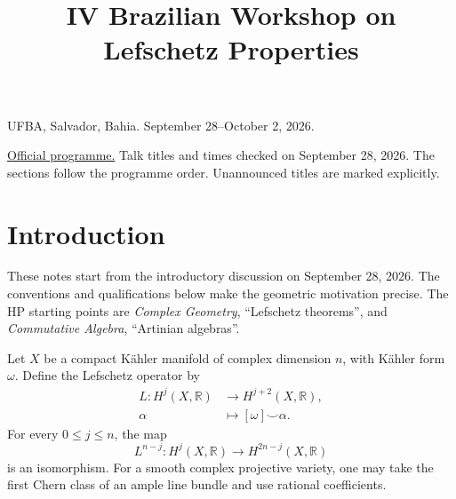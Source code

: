 


\title{IV Brazilian Workshop on
Lefschetz Properties}
\maketitle
{}
\label{section-phantom}
\tableofcontents

\medskip\noindent
UFBA, Salvador, Bahia.
September 28--October 2, 2026.

\href{%
https://jornadaslp.github.io/%
jornadas-lp/programacao.html%
}{Official programme.}
Talk titles and times checked on
September 28, 2026.
The sections follow the programme order.
Unannounced titles are marked explicitly.

\section{Introduction}
\label{section-introduction}

\noindent
These notes start from
the introductory discussion on
September 28, 2026.
The conventions and qualifications below
make the geometric motivation precise.
The HP starting points are
\emph{Complex Geometry},
``Lefschetz theorems'', and
\emph{Commutative Algebra},
``Artinian algebras''.

\begin{theorem}
\label{theorem-hard-lefschetz}
Let $X$ be a compact Kähler manifold of
complex dimension $n$, with Kähler form
$\omega$.
Define the Lefschetz operator by
$$
\begin{aligned}
L:H^j(X,\mathbb{R})
&\longrightarrow H^{j+2}(X,\mathbb{R}),\\
\alpha&\longmapsto[\omega]\smile\alpha.
\end{aligned}
$$
For every $0\leq j\leq n$, the map
$$
L^{n-j}:H^j(X,\mathbb{R})
\longrightarrow H^{2n-j}(X,\mathbb{R})
$$
is an isomorphism.
For a smooth complex projective variety,
one may take the first Chern class of an
ample line bundle and use rational
coefficients.
\end{theorem}

